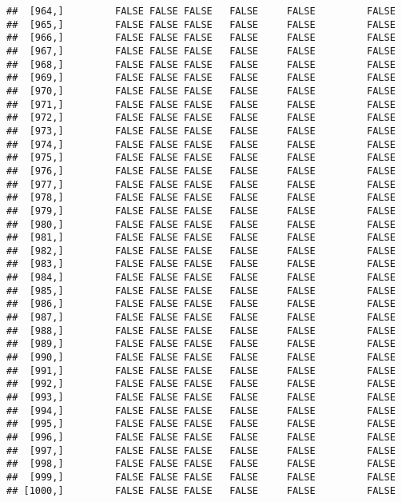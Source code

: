 \documentclass[
]{article}
\begin{document}
\begin{verbatim}
##  [964,]         FALSE FALSE FALSE   FALSE     FALSE         FALSE
##  [965,]         FALSE FALSE FALSE   FALSE     FALSE         FALSE
##  [966,]         FALSE FALSE FALSE   FALSE     FALSE         FALSE
##  [967,]         FALSE FALSE FALSE   FALSE     FALSE         FALSE
##  [968,]         FALSE FALSE FALSE   FALSE     FALSE         FALSE
##  [969,]         FALSE FALSE FALSE   FALSE     FALSE         FALSE
##  [970,]         FALSE FALSE FALSE   FALSE     FALSE         FALSE
##  [971,]         FALSE FALSE FALSE   FALSE     FALSE         FALSE
##  [972,]         FALSE FALSE FALSE   FALSE     FALSE         FALSE
##  [973,]         FALSE FALSE FALSE   FALSE     FALSE         FALSE
##  [974,]         FALSE FALSE FALSE   FALSE     FALSE         FALSE
##  [975,]         FALSE FALSE FALSE   FALSE     FALSE         FALSE
##  [976,]         FALSE FALSE FALSE   FALSE     FALSE         FALSE
##  [977,]         FALSE FALSE FALSE   FALSE     FALSE         FALSE
##  [978,]         FALSE FALSE FALSE   FALSE     FALSE         FALSE
##  [979,]         FALSE FALSE FALSE   FALSE     FALSE         FALSE
##  [980,]         FALSE FALSE FALSE   FALSE     FALSE         FALSE
##  [981,]         FALSE FALSE FALSE   FALSE     FALSE         FALSE
##  [982,]         FALSE FALSE FALSE   FALSE     FALSE         FALSE
##  [983,]         FALSE FALSE FALSE   FALSE     FALSE         FALSE
##  [984,]         FALSE FALSE FALSE   FALSE     FALSE         FALSE
##  [985,]         FALSE FALSE FALSE   FALSE     FALSE         FALSE
##  [986,]         FALSE FALSE FALSE   FALSE     FALSE         FALSE
##  [987,]         FALSE FALSE FALSE   FALSE     FALSE         FALSE
##  [988,]         FALSE FALSE FALSE   FALSE     FALSE         FALSE
##  [989,]         FALSE FALSE FALSE   FALSE     FALSE         FALSE
##  [990,]         FALSE FALSE FALSE   FALSE     FALSE         FALSE
##  [991,]         FALSE FALSE FALSE   FALSE     FALSE         FALSE
##  [992,]         FALSE FALSE FALSE   FALSE     FALSE         FALSE
##  [993,]         FALSE FALSE FALSE   FALSE     FALSE         FALSE
##  [994,]         FALSE FALSE FALSE   FALSE     FALSE         FALSE
##  [995,]         FALSE FALSE FALSE   FALSE     FALSE         FALSE
##  [996,]         FALSE FALSE FALSE   FALSE     FALSE         FALSE
##  [997,]         FALSE FALSE FALSE   FALSE     FALSE         FALSE
##  [998,]         FALSE FALSE FALSE   FALSE     FALSE         FALSE
##  [999,]         FALSE FALSE FALSE   FALSE     FALSE         FALSE
## [1000,]         FALSE FALSE FALSE   FALSE     FALSE         FALSE
\end{verbatim}
\end{document}
